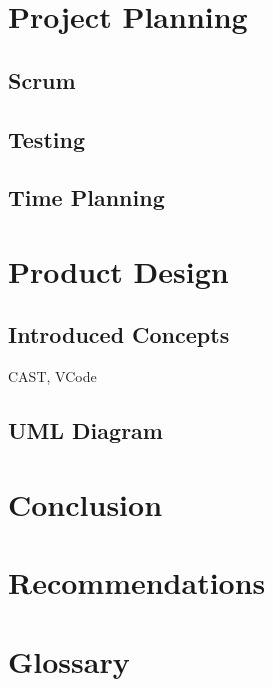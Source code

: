 \documentclass[12pt]{article}
\begin{document}
\section{Project Planning}
\subsection{Scrum}
\subsection{Testing}
\subsection{Time Planning}

\section{Product Design}
\subsection{Introduced Concepts}
CAST, VCode
\subsection{UML Diagram}

\section{Conclusion}

\section{Recommendations}

\section{Glossary}
\end{document}

